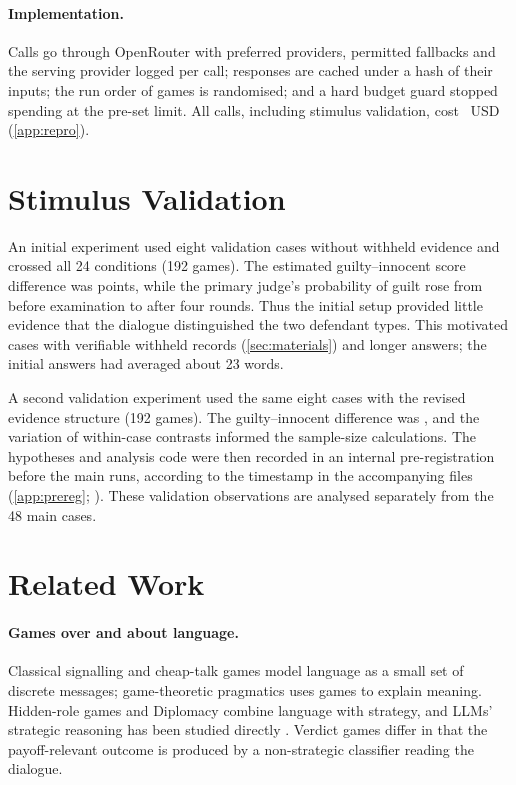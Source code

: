 \documentclass[10pt,a4paper]{article}
\theoremstyle{remark}
\begin{document}
\paragraph{Implementation.} Calls go through OpenRouter with preferred providers, permitted fallbacks and the serving provider logged per call;
responses are cached under a hash of their inputs; the run order of games is randomised; and a hard budget guard
stopped spending at the pre-set limit. All calls, including stimulus validation, cost
\TotalCost{}~USD (\cref{app:repro}).

\section{Stimulus Validation}\label{sec:validation}

An initial experiment used eight validation cases without withheld evidence and crossed all 24 conditions
(192 games). The estimated guilty--innocent score difference was \PoneTypeEst{} points, while the primary
judge's probability of guilt rose from \PoneDriftFrom{} before examination to \PoneDriftTo{} after four rounds.
Thus the initial setup provided little evidence that the dialogue distinguished the two defendant types.
This motivated cases with verifiable withheld records (\cref{sec:materials}) and longer answers; the initial
answers had averaged about 23 words.

A second validation experiment used the same eight cases with the revised evidence structure (192 games).
The guilty--innocent difference was \PtwoTypeEst{}, and the variation of within-case contrasts informed the
sample-size calculations. The hypotheses and analysis code were then recorded in an internal pre-registration
before the main runs, according to the timestamp in the accompanying files (\cref{app:prereg};
\citealp{nosek2018}). These validation observations are analysed separately from the 48 main cases.




\section{Related Work}\label{sec:related}

\paragraph{Games over and about language.}
Classical signalling and cheap-talk games \citep{tadelis2013} model language as a small set of discrete messages;
game-theoretic pragmatics \citep{goodman2016,jacob2024,hintikka2012} uses games to explain meaning. Hidden-role games
\citep{carminati2024,reinhardt2020,wang2024werewolf} and Diplomacy \citep{bakhtin2022} combine language with strategy,
and LLMs' strategic reasoning has been studied directly \citep{gandhi2023,bertolazzi2023}. Verdict games differ in that
the payoff-relevant outcome is produced by a non-strategic classifier reading the dialogue.
\end{document}
